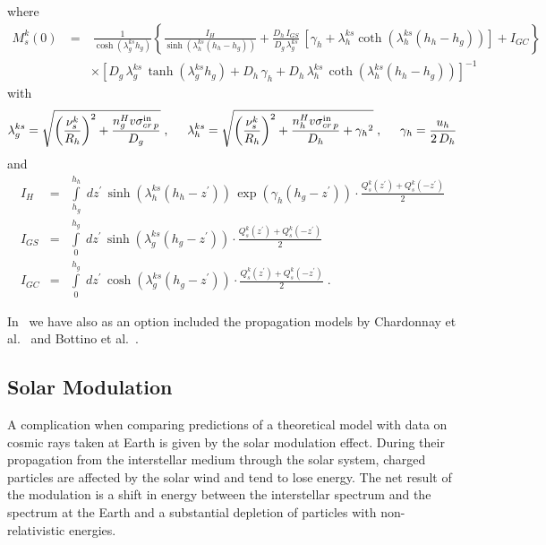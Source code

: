 where
\begin{eqnarray}
M_s^k(0) \ & = & \ \frac{1}{\cosh(\lambda_g^{ks} h_g)}
\left\{\frac{I_H}{\sinh\left(\lambda_h^{ks} (h_h-h_g)\right)}+
\frac{D_h\,I_{GS}}{D_g\, \lambda_g^{ks}} \,\left[\gamma_h +
\lambda_h^{ks} \coth\left(\lambda_h^{ks} (h_h-h_g)\right)\right]
+I_{GC}\right\} \nonumber \\
& & \times \left[D_g\,\lambda_g^{ks}\,\tanh\left(\lambda_g^{ks} h_g\right)
+ D_h\,\gamma_h + D_h\,\lambda_h^{ks}\,
\coth\left(\lambda_h^{ks} (h_h-h_g)\right) \right]^{-1}
\label{eq:halodiff}
\end{eqnarray}
with
\begin{eqnarray}
\lambda_g^{ks} = \sqrt{\left({\nu_s^k\over R_h}\right)^2 +
\frac{n_g^H v \sigma^{\rm in}_{cr\,p}}{D_g}} \;,\;\;\;\;\
\lambda_h^{ks} = \sqrt{\left({\nu_s^k\over R_h}\right)^2 +
\frac{n_h^H v \sigma^{\rm in}_{cr\,p}}{D_h} + {\gamma_h}^2}\;,\;\;\;\; \
\gamma_h = \frac{u_h}{2\,D_h}
\label{eq:halodiff2}
\end{eqnarray}
and
\begin{eqnarray}
I_H & = & \int\limits_{h_g}^{h_h} \;dz^{\prime} \,
\sinh\left(\lambda_h^{ks} (h_h-z^{\prime})\right) \,
\exp\left(\gamma_h (h_g-z^{\prime})\right)
\cdot \frac{Q_s^k(z^{\prime}) + Q_s^k(-z^{\prime})}{2} \nonumber \\
I_{GS} & = & \int\limits_{0}^{h_g} \;dz^{\prime} \,
\sinh\left(\lambda_g^{ks} (h_g-z^{\prime})\right)
\cdot \frac{Q_s^k(z^{\prime}) + Q_s^k(-z^{\prime})}{2} \nonumber \\
I_{GC} & = & \int\limits_{0}^{h_g} \;dz^{\prime} \,
\cosh\left(\lambda_g^{ks} (h_g-z^{\prime})\right)
\cdot \frac{Q_s^k(z^{\prime}) + Q_s^k(-z^{\prime})}{2} \;.
\label{eq:int}
\end{eqnarray}

In \ds\ we have also as an option included the propagation models by
Chardonnay et al.\ \cite{chardonnay} and Bottino et al.\
\cite{bottinopbar}.

\subsection{Solar Modulation}

A complication when comparing predictions of a theoretical
model with data on cosmic rays taken at Earth is given by the solar
modulation effect. During their propagation from the interstellar
medium through the solar system, charged particles are affected by the
solar wind and tend to lose energy. The net result of the modulation
is a shift in energy between the interstellar spectrum and the
spectrum at the Earth and a substantial depletion of particles with
non-relativistic energies.

